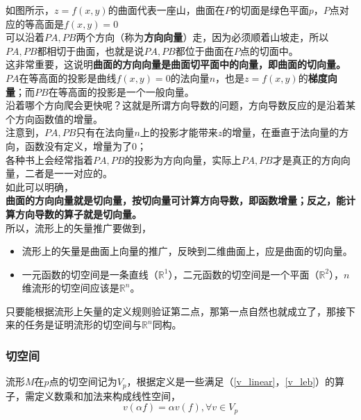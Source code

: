 	如图所示，$z=f(x,y)$的曲面代表一座山，曲面在$P$的切面是绿色平面$p$，$P$点对应的等高面是$f(x,y) = 0$\\

	可以沿着$PA,PB$两个方向（称为\textbf{方向向量}）走，因为必须顺着山坡走，所以$PA,PB$都相切于曲面，也就是说$PA,PB$都位于曲面在$P$点的切面中。\\

	这非常重要，这说明\textbf{曲面的方向向量是曲面切平面中的向量，即曲面的切向量。}\\

	$PA$在等高面的投影是曲线$f(x,y) = 0$的法向量$n$，也是$z=f(x,y)$的\textbf{梯度向量}；而$PB$在等高面的投影是一个一般向量。\\

	沿着哪个方向爬会更快呢？这就是所谓方向导数的问题，方向导数反应的是沿着某个方向函数值的增量。\\

	注意到，$PA,PB$只有在法向量$n$上的投影才能带来$z$的增量，在垂直于法向量的方向，函数没有定义，增量为了$0$；\\

	各种书上会经常指着$PA,PB$的投影为方向向量，实际上$PA,PB$才是真正的方向向量，二者是一一对应的。\\

	如此可以明确，\\

	\textbf{曲面的方向向量就是切向量，按切向量可计算方向导数，即函数增量；反之，能计算方向导数的算子就是切向量。}\\

	所以，流形上的矢量推广要做到，

	\begin{itemize}
		\item 流形上的矢量是曲面上向量的推广，反映到二维曲面上，应是曲面的切向量。
		\item 一元函数的切空间是一条直线（$\mathbb{R}^1$），二元函数的切空间是一个平面（$\mathbb{R}^2$），$n$维流形的切空间应该是$\mathbb{R}^n$。
	\end{itemize}
	

	只要能根据流形上矢量的定义规则验证第二点，那第一点自然也就成立了，那接下来的任务是证明流形的切空间与$\mathbb{R}^n$同构。

\subsubsection*{切空间}

	流形$M$在$p$点的切空间记为$V_p$，根据定义是一些满足（\ref{v_linear}，\ref{v_leb}）的算子，需定义数乘和加法来构成线性空间，
	$$
		v(\alpha f) = \alpha v(f), \forall v \in V_p
	$$

